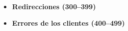 \begin{itemize}
	\item \textbf{Redirecciones (300–399)}
	
	\item \textbf{Errores de los clientes (400–499)}
	

\end{itemize}
